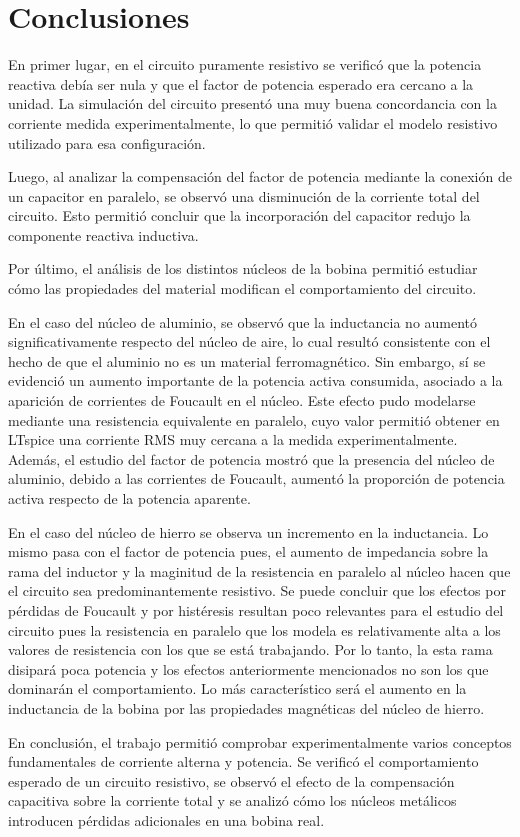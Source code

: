 
\section{Conclusiones}

En primer lugar, en el circuito puramente resistivo se verificó que la potencia reactiva debía ser nula y que el factor de potencia esperado era cercano a la unidad. La simulación del circuito presentó una muy buena concordancia con la corriente medida experimentalmente, lo que permitió validar el modelo resistivo utilizado para esa configuración.

Luego, al analizar la compensación del factor de potencia mediante la conexión de un capacitor en paralelo, se observó una disminución de la corriente total del circuito. Esto permitió concluir que la incorporación del capacitor redujo la componente reactiva inductiva.

Por último, el análisis de los distintos núcleos de la bobina permitió estudiar cómo las propiedades del material modifican el comportamiento del circuito. 

En el caso del núcleo de aluminio, se observó que la inductancia no aumentó significativamente respecto del núcleo de aire, lo cual resultó consistente con el hecho de que el aluminio no es un material ferromagnético. Sin embargo, sí se evidenció un aumento importante de la potencia activa consumida, asociado a la aparición de corrientes de Foucault en el núcleo. Este efecto pudo modelarse mediante una resistencia equivalente en paralelo, cuyo valor permitió obtener en LTspice una corriente RMS muy cercana a la medida experimentalmente. Además, el estudio del factor de potencia mostró que la presencia del núcleo de aluminio, debido a las corrientes de Foucault, aumentó la proporción de potencia activa respecto de la potencia aparente.

En el caso del núcleo de hierro se observa un incremento en la inductancia. Lo mismo pasa con el factor de potencia pues, el aumento de impedancia sobre la rama del inductor y la maginitud de la resistencia en paralelo al núcleo hacen que el circuito sea predominantemente resistivo. Se puede concluir que los efectos por pérdidas de Foucault y por histéresis resultan poco relevantes para el estudio del circuito pues la resistencia en paralelo que los modela es relativamente alta a los valores de resistencia con los que se está trabajando. Por lo tanto, la esta rama disipará poca potencia y los efectos anteriormente mencionados no son los que dominarán el comportamiento. Lo más característico será el aumento en la inductancia de la bobina por las propiedades magnéticas del núcleo de hierro. 

En conclusión, el trabajo permitió comprobar experimentalmente varios conceptos fundamentales de corriente alterna y potencia. Se verificó el comportamiento esperado de un circuito resistivo, se observó el efecto de la compensación capacitiva sobre la corriente total y se analizó cómo los núcleos metálicos introducen pérdidas adicionales en una bobina real.
\newpage